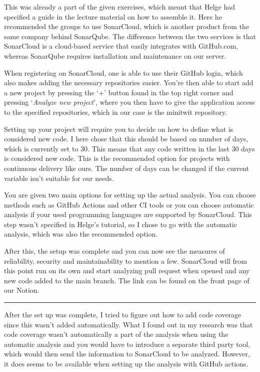 This was already a part of the given exercises, which meant that Helge had specified a guide in the lecture material on how to assemble it. Here he recommended the groups to use SonarCloud, which is another product from the same company behind SonarQube. The difference between the two services is that SonarCloud is a cloud-based service that easily integrates with GitHub.com, whereas SonarQube requires installation and maintenance on our server.

When registering on SonarCloud, one is able to use their GitHub login, which also makes adding the necessary repositories easier. You're then able to start add a new project by pressing the `+' button found in the top right corner and pressing `\emph{Analyze new project}', where you then have to give the application access to the specified repositories, which in our case is the minitwit repository.

Setting up your project will require you to decide on how to define what is considered new code. I here chose that this should be based on number of days, which is currently set to 30. This means that any code written in the last 30 days is considered new code. This is the recommended option for projects with continuous delivery like ours. The number of days can be changed if the current variable isn't suitable for our needs.

You are given two main options for setting up the actual analysis. You can choose methods such as GitHub Actions and other CI tools or you can choose automatic analysis if your used programming languages are supported by SonarCloud. This step wasn't specified in Helge's tutorial, so I chose to go with the automatic analysis, which was also the recommended option.

After this, the setup was complete and you can now see the measures of reliability, security and maintainability to mention a few. SonarCloud will from this point run on its own and start analyzing pull request when opened and any new code added to the main branch. The link can be found on the front page of our Notion.

\begin{center}\rule{0.5\linewidth}{0.5pt}\end{center}

After the set up was complete, I tried to figure out how to add code coverage since this wasn't added automatically. What I found out in my research was that code coverage wasn't automatically a part of the analysis when using the automatic analysis and you would have to introduce a separate third party tool, which would then send the information to SonarCloud to be analyzed. However, it does seems to be available when setting up the analysis with GitHub actions.

